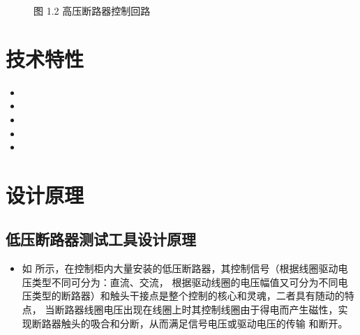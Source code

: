 \documentclass[a4paper,10pt,english]{sphinxmanual}
\begin{document}
\begin{figure}[htbp]
\centering
\capstart

\noindent{}
\caption{图 1.2 高压断路器控制回路}\label{\detokenize{summary:id3}}\end{figure}


\section{技术特性}
\label{\detokenize{te_characteristics:id1}}\label{\detokenize{te_characteristics::doc}}\begin{itemize}
\item {} 
\sphinxAtStartPar
{}

\item {} 
\sphinxAtStartPar
{}

\item {} 
\sphinxAtStartPar
{}

\item {} 
\sphinxAtStartPar
{}

\item {} 
\sphinxAtStartPar
{}

\end{itemize}


\section{设计原理}
\label{\detokenize{work_principle:id1}}\label{\detokenize{work_principle::doc}}

\subsection{低压断路器测试工具设计原理}
\label{\detokenize{work_principle:id2}}\begin{itemize}
\item {} 
\sphinxAtStartPar
如  所示，在控制柜内大量安装的低压断路器，其控制信号（根据线圈驱动电压类型不同可分为：直流、交流，
根据驱动线圈的电压幅值又可分为不同电压类型的断路器）和触头干接点是整个控制的核心和灵魂，二者具有随动的特点，
当断路器线圈电压出现在线圈上时其控制线圈由于得电而产生磁性，实现断路器触头的吸合和分断，从而满足信号电压或驱动电压的传输
和断开。

\end{itemize}
\end{document}
